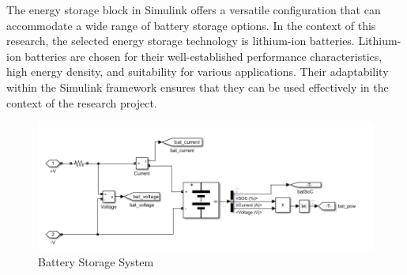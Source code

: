 The energy storage block in Simulink offers a versatile configuration that can accommodate a wide range of battery storage options. In the context of this research, the selected energy storage technology is lithium-ion batteries. Lithium-ion batteries are chosen for their well-established performance characteristics, high energy density, and suitability for various applications. Their adaptability within the Simulink framework ensures that they can be used effectively in the context of the research project.
\begin{figure}[H]
	\centering
	\includegraphics[totalheight=5cm]{Figures/bess.png}
	\caption{Battery Storage System}
\end{figure}

